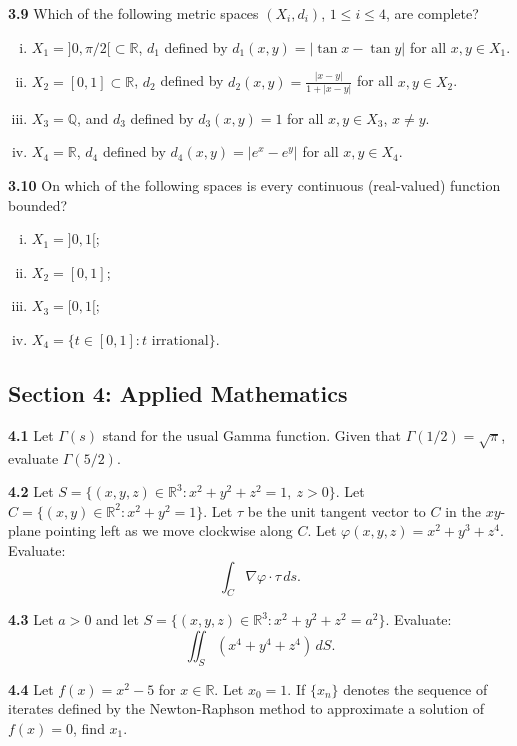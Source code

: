 \documentclass[11pt,a4paper]{article}
\newcommand{\Q}{\mathbb{Q}}
\newcommand{\R}{\mathbb{R}}
\newcommand{\examsec}[1]{%
  \subsection*{#1}
  \vspace{-2pt}
}
\newcommand{\qitem}[1]{\par\medskip\noindent\textbf{#1}\hspace{0.5em}}
\begin{document}
\qitem{3.9} Which of the following metric spaces $(X_i, d_i)$, $1 \le i \le 4$, are complete?
\begin{enumerate}[i)]
  \item $X_1 = ]0, \pi/2[ \subset \R$, $d_1$ defined by $d_1(x, y) = |\tan x - \tan y|$ for all $x, y \in X_1$.
  \item $X_2 = [0, 1] \subset \R$, $d_2$ defined by $d_2(x, y) = \frac{|x-y|}{1+|x-y|}$ for all $x, y \in X_2$.
  \item $X_3 = \Q$, and $d_3$ defined by $d_3(x, y) = 1$ for all $x, y \in X_3$, $x \neq y$.
  \item $X_4 = \R$, $d_4$ defined by $d_4(x, y) = |e^x - e^y|$ for all $x, y \in X_4$.
\end{enumerate}

\qitem{3.10} On which of the following spaces is every continuous (real-valued) function bounded?
\begin{enumerate}[i)]
  \item $X_1 = ]0, 1[$;
  \item $X_2 = [0, 1]$;
  \item $X_3 = [0, 1[$;
  \item $X_4 = \{t \in [0, 1] : t \text{ irrational}\}$.
\end{enumerate}

\examsec{Section 4: Applied Mathematics}

\qitem{4.1} Let $\Gamma(s)$ stand for the usual Gamma function. Given that $\Gamma(1/2) = \sqrt{\pi}$, evaluate $\Gamma(5/2)$.

\qitem{4.2} Let $S = \{(x, y, z) \in \R^3 : x^2 + y^2 + z^2 = 1,\ z > 0\}$. Let $C = \{(x, y) \in \R^2 : x^2 + y^2 = 1\}$. Let $\tau$ be the unit tangent vector to $C$ in the $xy$-plane pointing left as we move clockwise along $C$. Let $\varphi(x, y, z) = x^2 + y^3 + z^4$. Evaluate:
\[
  \int_C \nabla \varphi \cdot \tau\,ds.
\]

\qitem{4.3} Let $a > 0$ and let $S = \{(x, y, z) \in \R^3 : x^2 + y^2 + z^2 = a^2\}$. Evaluate:
\[
  \iint_S (x^4 + y^4 + z^4)\,dS.
\]

\qitem{4.4} Let $f(x) = x^2 - 5$ for $x \in \R$. Let $x_0 = 1$. If $\{x_n\}$ denotes the sequence of iterates defined by the Newton-Raphson method to approximate a solution of $f(x) = 0$, find $x_1$.
\end{document}
